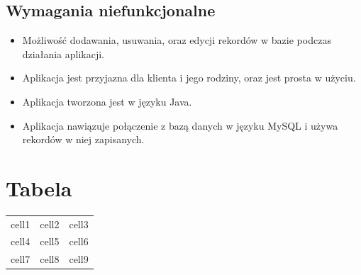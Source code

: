 \documentclass[12pt, letterpaper]{article}
\begin{document}
\newpage

\subsection{Wymagania niefunkcjonalne}
\begin{itemize}
\item Możliwość dodawania, usuwania, oraz edycji rekordów w bazie podczas działania aplikacji.
\item Aplikacja jest przyjazna dla klienta i jego rodziny, oraz jest prosta w użyciu.
\item Aplikacja tworzona jest w języku Java.
\item Aplikacja nawiązuje połączenie z bazą danych w języku MySQL i używa rekordów w niej zapisanych.
\end{itemize}

\section{Tabela}

\begin{center}
\begin{tabular}{|c|c|c|}
\hline
cell1 & cell2 & cell3 \\
cell4 & cell5 & cell6 \\
cell7 & cell8 & cell9 \\
\hline
\end{tabular}
\end{center}
\end{document}
